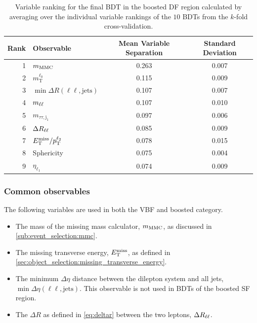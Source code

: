 \begin{table}[htpb]
    \centering
    \caption{Variable ranking for the final BDT in the boosted DF region calculated by averaging over the individual
             variable rankings of the $10$ BDTs from the $k$-fold cross-validation.}\label{tab:mva:variables:ranking:BOOSTDF}
    \begin{tabular}{rlcc}
        \toprule
        Rank & Observable & Mean Variable Separation & Standard Deviation \\ \midrule
        1 & $m_\text{MMC}$ & 0.263 & 0.007 \\
        2 & $m_\text{T}^{\ell_0}$ & 0.115 & 0.009 \\
        3 & $\min \Delta R (\ell\ell, \text{jets})$ & 0.107 & 0.007 \\
        4 & $m_{\ell\ell}$ & 0.107 & 0.010 \\
        5 & $m_{\tau\tau,\text{j}_1}$ & 0.097 & 0.006 \\
        6 & $\Delta R_{\ell\ell}$ & 0.085 & 0.009 \\
        7 & $E_\text{T}^\text{miss} / p_\text{T}^{\ell_2}$ & 0.078 & 0.015 \\
        8 & Sphericity & 0.075 & 0.004 \\
        9 & $\eta_{\ell_1}$ & 0.074 & 0.009 \\
        \bottomrule
    \end{tabular}
\end{table}


\subsubsection{Common observables}
The following variables are used in both the VBF and boosted category.
\begin{itemize}
    \item The mass of the missing mass calculator, $m_\text{MMC}$, as discussed in \cref{sub:event_selection:mmc}.
    \item The missing transverse energy, $E_\text{T}^\text{miss}$, as defined in \cref{sec:object_selection:missing_transverse_energy}.
    \item The minimum $\Delta \eta$ distance between the dilepton system and all jets, $\min \Delta \eta (\ell\ell, \text{jets})$.
        This observable is not used in BDTs of the boosted SF region.
    \item The $\Delta R$ as defined in \cref{eq:deltar} between the two leptons, $\Delta R_{\ell\ell}$.
\end{itemize}


